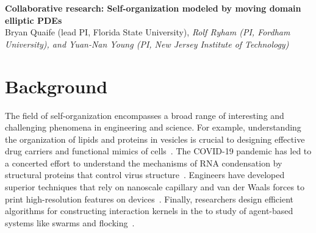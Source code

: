 \noindent
{\bf Collaborative research: Self-organization modeled by moving domain
elliptic PDEs} \\
{Bryan Quaife (lead PI, Florida State University), \em Rolf Ryham (PI,
Fordham University), and Yuan-Nan Young (PI, New Jersey Institute of
Technology)}

\section{Background}
\label{sec:background}

The field of self-organization encompasses a broad range of interesting
and challenging phenomena in engineering and science. For example,
understanding the organization of lipids and proteins in vesicles is
crucial to designing effective drug carriers and functional mimics of
cells~\cite{Marui2022IncreasedEO,
https://doi.org/10.1002/adma.202206288}. The COVID-19 pandemic has led
to a concerted effort to understand the mechanisms of RNA condensation
by structural proteins that control virus
structure~\cite{Kim2021SelfassembledMV}. Engineers have developed
superior techniques that rely on nanoscale capillary and van der Waals
forces to print high-resolution features on
devices~\cite{Zeng20223DprintedMT}. Finally, researchers design
efficient algorithms for constructing interaction kernels in the to
study of agent-based systems like swarms and
flocking~\cite{Lu2019NonparametricIO, Tadmor2021OnTM}.


